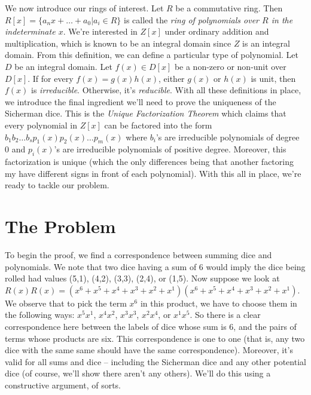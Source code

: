 \documentclass[12pt]{report}
\begin{document}
We now introduce our rings of interest. Let $R$ be a commutative ring. Then
$R[x]=\{ a_{n}x + \ldots + a_{0} | a_{i}\in R\}$ is called the \textit{ring of polynomials over $R$ in the
indeterminate $x$}. We're interested in $Z[x]$ under ordinary addition and multiplication, which is known to
be an integral domain since $Z$ is an integral domain. From this definition, we can define a particular type
of polynomial. Let $D$ be an integral domain. Let $f(x)\in D[x]$ be a non-zero or non-unit over $D[x]$. If for
every $f(x)=g(x)h(x)$, either $g(x)$ or $h(x)$ is unit, then $f(x)$ is \textit{irreducible}. Otherwise, it's
\textit{reducible}. With all these definitions in place, we introduce the final ingredient we'll need to prove
the uniqueness of the Sicherman dice. This is the \textit{Unique Factorization Theorem} which claims that
every polynomial in $Z[x]$ can be factored into the form
$b_{1}b_{2}\ldots b_{s}p_{1}(x)p_{2}(x)\ldots p_{m}(x)$ where $b_{i}$'s are irreducible polynomials of degree
$0$ and $p_{i}(x)$'s are irreducible polynomials of positive degree. Moreover, this factorization is unique
(which the only differences being that another factoring my have different signs in front of each polynomial).
With this all in place, we're ready to tackle our problem.

\section*{The Problem}
To begin the proof, we find a correspondence between summing dice and polynomials. We note that two dice
having a sum of 6 would imply the dice being rolled had values (5,1), (4,2), (3,3), (2,4), or (1,5). Now
suppose we look at $R(x)R(x)=(x^{6}+x^{5}+x^{4}+x^{3}+x^{2}+x^{1})(x^{6}+x^{5}+x^{4}+x^{3}+x^{2}+x^{1})$. We
observe that to pick the term $x^{6}$ in this product, we have to choose them in the following ways:
$x^{5}x^{1}$, $x^{4}x^{2}$, $x^{3}x^{3}$, $x^{2}x^{4}$, or $x^{1}x^{5}$. So there is a clear correspondence
here between the labels of dice whose sum is 6, and the pairs of terms whose products are six. This
correspondence is one to one (that is, any two dice with the same same should have the same correspondence).
Moreover, it's valid for all sums and dice -- including the Sicherman dice and any other potential dice (of
course, we'll show there aren't any others). We'll do this using a constructive argument, of sorts.
\end{document}
